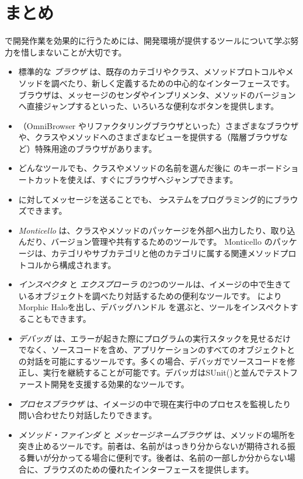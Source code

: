 \documentclass[a4paper,10pt,twoside]{book}
\begin{document}
\section{まとめ}

\pharo で開発作業を効果的に行うためには、開発環境が提供するツールについて学ぶ努力を惜しまないことが大切です。

\begin{itemize}
  \item 標準的な \emph{ブラウザ} は、既存のカテゴリやクラス、メソッドプロトコルやメソッドを調べたり、新しく定義するための中心的なインターフェースです。
    ブラウザは、メッセージのセンダやインプリメンタ、メソッドのバージョンへ直接ジャンプするといった、いろいろな便利なボタンを提供します。
  \item （OmniBrowser やリファクタリングブラウザといった）さまざまなブラウザや、クラスやメソッドへのさまざまなビューを提供する（階層ブラウザなど）特殊用途のブラウザがあります。
  \item どんなツールでも、クラスやメソッドの名前を選んだ後に  のキーボードショートカットを使えば、すぐにブラウザへジャンプできます。
  \item {} に対してメッセージを送ることでも、 \st システムをプログラミング的にブラウズできます。
  \item \emph{Monticello} は、クラスやメソッドのパッケージを外部へ出力したり、取り込んだり、バージョン管理や共有するためのツールです。
    Monticello のパッケージは、カテゴリやサブカテゴリと他のカテゴリに属する関連メソッドプロトコルから構成されます。
  \item \emph{インスペクタ} と \emph{エクスプローラ} の2つのツールは、イメージの中で生きているオブジェクトを調べたり対話するための便利なツールです。
     によりMorphic Haloを出し、デバッグハンドル \debugHandle を選ぶと、ツールをインスペクトすることもできます。
  \item \emph{デバッガ} は、エラーが起きた際にプログラムの実行スタックを見せるだけでなく、ソースコードを含め、アプリケーションのすべてのオブジェクトとの対話を可能にするツールです。多くの場合、デバッガでソースコードを修正し、実行を継続することが可能です。デバッガはSUnit()と並んでテストファースト開発を支援する効果的なツールです。
  \item \emph{プロセスブラウザ} は、イメージの中で現在実行中のプロセスを監視したり問い合わせたり対話したりできます。
  \item \emph{メソッド・ファインダ} と \emph{メッセージネームブラウザ} は、メソッドの場所を突き止めるツールです。前者は、名前がはっきり分からないが期待される振る舞いが分かってる場合に便利です。後者は、名前の一部しか分からない場合に、ブラウズのための優れたインターフェースを提供します。

\end{itemize}
\end{document}

